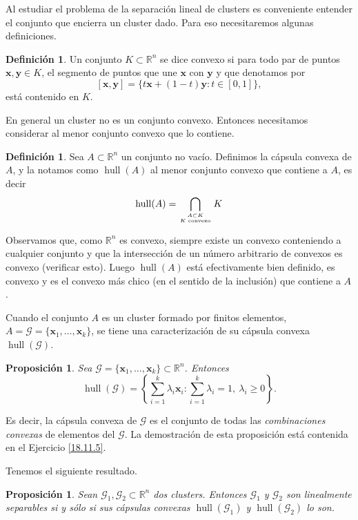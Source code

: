 \documentclass[12pt, a4paper]{amsbook}
\def\hull{\operatorname {\mathrm{hull}}}
\newcommand{\R}{{\mathbb R}}
\newcommand{\G}{{\mathcal G}}
\newcommand{\xx}{{\mathbf x}}
\newcommand{\yy}{{\mathbf y}}
\newtheorem{prop}[teo]{Proposici\'on}
\theoremstyle{remark}
\theoremstyle{definition}
\newtheorem{defi}[teo]{Definici\'on}
\numberwithin{section}{chapter}
\numberwithin{subsection}{section}
\numberwithin{equation}{section}
\numberwithin{figure}{chapter}
\begin{document}
Al estudiar el problema de la separación lineal de clusters es conveniente entender el conjunto que encierra un cluster dado. Para eso necesitaremos algunas definiciones.
\begin{defi}
Un conjunto $K\subset \R^n$ se dice convexo si para todo par de puntos $\xx, \yy\in K$, el segmento de puntos que une $\xx$ con $\yy$ y que denotamos por
$$
[\xx, \yy] = \{ t\xx + (1-t)\yy\colon t\in [0,1]\},
$$
está contenido en $K$.
\end{defi}

En general un cluster no es un conjunto convexo. Entonces necesitamos considerar al menor conjunto convexo que lo contiene.
\begin{defi}
Sea $A\subset\R^n$ un conjunto no vacío. Definimos la cápsula convexa de $A$, y la notamos como $\hull(A)$ al menor conjunto convexo que contiene a $A$, es decir
$$
\hull(A) = \bigcap_{{A\subset K}\atop{K \text{ convexo}}} K
$$
\end{defi}

Observamos que, como $\R^n$ es convexo, siempre existe un convexo conteniendo a cualquier conjunto y que la intersección de un número arbitrario de convexos es convexo (verificar esto). Luego $\hull(A)$ está efectivamente bien definido, es convexo y es el convexo más chico (en el sentido de la inclusión) que contiene a $A$.

Cuando el conjunto $A$ es un cluster formado por finitos elementos, $A=\G=\{\xx_1,\dots,\xx_k\}$, se tiene una caracterización de su cápsula convexa $\hull(\G)$.
\begin{prop}\label{prop1053}
Sea $\G=\{\xx_1,\dots,\xx_k\}\subset \R^n$. Entonces
$$
\hull(\G) = \left\{\sum_{i=1}^k \lambda_i \xx_i\colon \sum_{i=1}^k \lambda_i = 1,\ \lambda_i\ge 0\right\}.
$$
\end{prop}

Es decir, la cápsula convexa de $\G$ es el conjunto de todas las {\em combinaciones convexas} de elementos del $\G$. La demostración de esta proposición está contenida en el Ejercicio \ref{18.11.5}.

Tenemos el siguiente resultado.
\begin{prop}
Sean $\G_1, \G_2\subset \R^n$ dos clusters. Entonces $\G_1$ y $\G_2$ son linealmente separables si y sólo si sus cápsulas convexas $\hull(\G_1)$ y $\hull(\G_2)$ lo son.
\end{prop}
\end{document}
